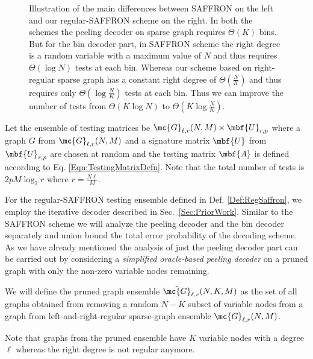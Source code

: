 \documentclass[conference,twocolumn]{IEEEtran}
\newcommand*{\FigPath}{./Figures}
\begin{document}
\begin{figure*}[t!]
\centering \scalebox{1}{}
\caption{Illustration of the main differences between SAFFRON \cite{lee2015saffron} on the left and our regular-SAFFRON scheme on the right. In both the schemes the peeling decoder on sparse graph requires $\Theta(K)$ bins. But for the bin decoder part, in SAFFRON scheme the right degree is a random variable with a maximum value of $N$ and thus requires $\Theta(\log N)$ tests at each bin. Whereas our scheme based on right-regular sparse graph has a constant right degree of $\Theta(\frac{N}{K})$ and thus requires only $\Theta(\log \frac{N}{K})$ tests at each bin. Thus we can improve the number of tests from $\Theta (K\log N)$ to $\Theta(K\log \frac{N}{K})$.}
\end{figure*}

\begin{definition}
\label{Def:RegSaffron}
Let the ensemble of testing matrices be $\mc{G}_{\ell,r}(N,M)\times \mbf{U}_{r,p}$ where a graph $G$ from $\mc{G}_{\ell,r}(N,M)$ and a signature matrix $\mbf{U}$ from $\mbf{U}_{r,p}$ are chosen at random and the testing matrix $\mbf{A}$ is defined according to Eq. \eqref{Eqn:TestingMatrixDefn}. Note that the total number of tests is $2pM\log_2 r$ where $r=\frac{N\ell}{M}$.
\end{definition}

For the regular-SAFFRON testing ensemble defined in Def. \ref{Def:RegSaffron}, we employ the iterative decoder described in Sec.~\ref{Sec:PriorWork}. Similar to the SAFFRON scheme we will analyze the peeling decoder and the bin decoder separately and union bound the total error probability of the decoding scheme. As we have already mentioned the analysis of just the peeling decoder part can be carried out by considering a \textit{simplified oracle-based peeling decoder} on a pruned graph with only the non-zero variable nodes remaining. 

\begin{definition}
We will define the pruned graph ensemble $\tilde{\mc{G}}_{\ell,r}(N,K,M)$ as the set of all graphs obtained from removing a random $N-K$ subset of variable nodes from a graph from left-and-right-regular sparse-graph ensemble $\mc{G}_{\ell,r}(N,M)$.
\end{definition}

Note that graphs from the pruned ensemble have $K$ variable nodes with a degree $\ell$ whereas the right degree is not regular anymore. 
\end{document}

